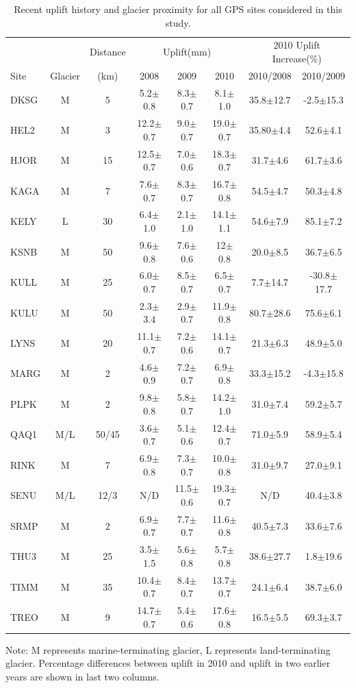 \clearpage
\begin{center}
\begin{table}[h!]
\caption{Recent uplift history and glacier proximity for all GPS sites considered in this study.}
\begin{threeparttable}
\begin{tabular}{lccccccc}
\midrule
     &         & Distance & \multicolumn{3}{c}{Uplift(mm)} & \multicolumn{2}{c}{2010 Uplift Increase(\%)}\\
     \cmidrule(l){4-6} 
     \cmidrule(l){7-8} 
Site & Glacier & (km) & 2008 & 2009 & 2010 & 2010/2008 & 2010/2009\\
\midrule 
DKSG&M&5&5.2$\pm$0.8&8.3$\pm$0.7&8.1$\pm$1.0&35.8$\pm$12.7&-2.5$\pm$15.3\\
HEL2&M&3&12.2$\pm$0.7&9.0$\pm$0.7&19.0$\pm$0.7&35.80$\pm$4.4&52.6$\pm$4.1\\
HJOR&M&15&12.5$\pm$0.7&7.0$\pm$0.6&18.3$\pm$0.7&31.7$\pm$4.6&61.7$\pm$3.6\\
KAGA&M&7&7.6$\pm$0.7&8.3$\pm$0.7&16.7$\pm$0.8&54.5$\pm$4.7&50.3$\pm$4.8\\
KELY&L&30&6.4$\pm$1.0&2.1$\pm$1.0&14.1$\pm$1.1&54.6$\pm$7.9&85.1$\pm$7.2\\
KSNB&M&50&9.6$\pm$0.8&7.6$\pm$0.6&12$\pm$0.8&20.0$\pm$8.5&36.7$\pm$6.5\\
KULL&M&25&6.0$\pm$0.7&8.5$\pm$0.7&6.5$\pm$0.7&7.7$\pm$14.7&-30.8$\pm$17.7\\
KULU&M&50&2.3$\pm$3.4&2.9$\pm$0.7&11.9$\pm$0.8&80.7$\pm$28.6&75.6$\pm$6.1\\
LYNS&M&20&11.1$\pm$0.7&7.2$\pm$0.6&14.1$\pm$0.7&21.3$\pm$6.3&48.9$\pm$5.0\\
MARG&M&2&4.6$\pm$0.9&7.2$\pm$0.7&6.9$\pm$0.8&33.3$\pm$15.2&-4.3$\pm$15.8\\
PLPK&M&2&9.8$\pm$0.8&5.8$\pm$0.7&14.2$\pm$1.0&31.0$\pm$7.4&59.2$\pm$5.7\\
QAQ1&M/L&50/45&3.6$\pm$0.7&5.1$\pm$0.6&12.4$\pm$0.7&71.0$\pm$5.9&58.9$\pm$5.4\\
RINK&M&7&6.9$\pm$0.8&7.3$\pm$0.7&10.0$\pm$0.8&31.0$\pm$9.7&27.0$\pm$9.1\\
SENU&M/L&12/3&N/D&11.5$\pm$0.6&19.3$\pm$0.7&N/D&40.4$\pm$3.8\\
SRMP&M&2&6.9$\pm$0.7&7.7$\pm$0.7&11.6$\pm$0.8&40.5$\pm$7.3&33.6$\pm$7.6\\
THU3&M&25&3.5$\pm$1.5&5.6$\pm$0.8&5.7$\pm$0.8&38.6$\pm$27.7&1.8$\pm$19.6\\
TIMM&M&35&10.4$\pm$0.7&8.4$\pm$0.7&13.7$\pm$0.7&24.1$\pm$6.4&38.7$\pm$6.0\\
TREO&M&9&14.7$\pm$0.7&5.4$\pm$0.6&17.6$\pm$0.8&16.5$\pm$5.5&69.3$\pm$3.7\\
\midrule
\end{tabular}
\begin{tablenotes}
\small
\item Note: M represents marine-terminating glacier, L represents land-terminating glacier. Percentage differences between uplift in 2010 and uplift in two earlier years are shown in last two columns. 
\end{tablenotes}
\end{threeparttable}
\label{tab:chpt3_table2}
\end{table}
\end{center}

